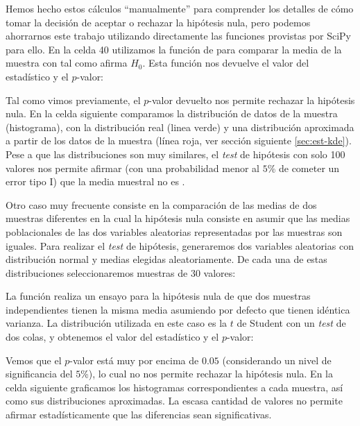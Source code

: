 
Hemos hecho estos cálculos ``manualmente'' para comprender los detalles de cómo tomar la decisión de aceptar o rechazar la hipótesis nula, pero podemos ahorrarnos este trabajo utilizando directamente las funciones provistas por SciPy para ello. En la celda 40 utilizamos la función  de  para comparar la media de la muestra con  tal como afirma $H_0$. Esta función nos devuelve el valor del estadístico y el $p$-valor:


Tal como vimos previamente, el $p$-valor devuelto nos permite rechazar la hipótesis nula. En la celda siguiente comparamos la distribución de datos de la muestra (histograma), con la distribución real (linea verde) y una distribución aproximada a partir de los datos de la muestra (línea roja, ver sección siguiente \ref{sec:est-kde}). Pese a que las distribuciones son muy similares, el \textit{test} de hipótesis con solo 100 valores nos permite afirmar (con una probabilidad menor al $5$\% de cometer un error tipo I) que la media muestral no es .


Otro caso muy frecuente consiste en la comparación de las medias de dos muestras diferentes en la cual la hipótesis nula consiste en asumir que las medias poblacionales de las dos variables aleatorias representadas por las muestras son iguales. Para realizar el \textit{test} de hipótesis, generaremos dos variables aleatorias con distribución normal y medias elegidas aleatoriamente. De cada una de estas distribuciones seleccionaremos muestras de 30 valores:


La función  realiza un ensayo para la hipótesis nula de que dos muestras independientes tienen la misma media asumiendo por defecto que tienen idéntica varianza. La distribución utilizada en este caso es la $t$ de Student con un \textit{test} de dos colas, y obtenemos el valor del estadístico y el $p$-valor:


Vemos que el $p$-valor está muy por encima de $0.05$ (considerando un nivel de significancia del $5$\%), lo cual no nos permite rechazar la hipótesis nula. En la celda siguiente graficamos los histogramas correspondientes a cada muestra, así como sus distribuciones aproximadas. La escasa cantidad de valores no permite afirmar estadísticamente que las diferencias sean significativas. 

